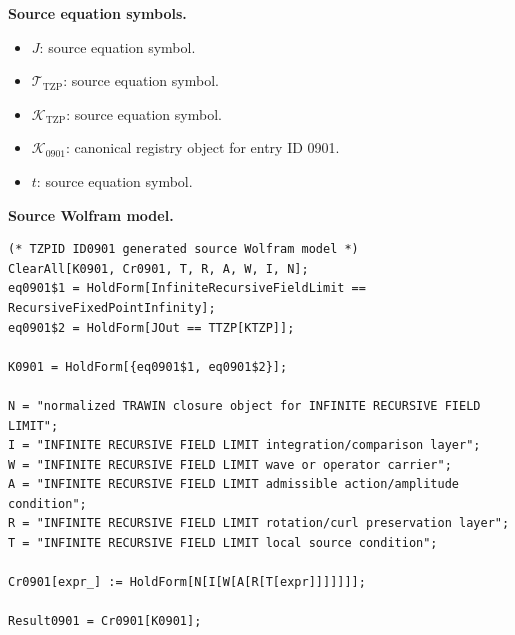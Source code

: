 \begin{minipage}[t]{0.49\linewidth}
\begingroup
\small
\raggedright
\textbf{Source equation symbols.}\par
\begin{itemize}[leftmargin=1.35em,itemsep=1pt,topsep=1pt,parsep=0pt]
    \item $J$: source equation symbol.
    \item $\mathcal{T}_{\mathrm{TZP}}$: source equation symbol.
    \item $\mathcal{K}_{\mathrm{TZP}}$: source equation symbol.
    \item $\mathcal{K}_{0901}$: canonical registry object for entry ID 0901.
    \item $t$: source equation symbol.
\end{itemize}
\endgroup
\end{minipage}\hfill
\begin{minipage}[t]{0.47\linewidth}
\begingroup
\scriptsize
\raggedright
\textbf{Source Wolfram model.}\par
\begin{Verbatim}[fontsize=\tiny,breaklines=true,breakanywhere=true]
(* TZPID ID0901 generated source Wolfram model *)
ClearAll[K0901, Cr0901, T, R, A, W, I, N];
eq0901$1 = HoldForm[InfiniteRecursiveFieldLimit == RecursiveFixedPointInfinity];
eq0901$2 = HoldForm[JOut == TTZP[KTZP]];

K0901 = HoldForm[{eq0901$1, eq0901$2}];

N = "normalized TRAWIN closure object for INFINITE RECURSIVE FIELD LIMIT";
I = "INFINITE RECURSIVE FIELD LIMIT integration/comparison layer";
W = "INFINITE RECURSIVE FIELD LIMIT wave or operator carrier";
A = "INFINITE RECURSIVE FIELD LIMIT admissible action/amplitude condition";
R = "INFINITE RECURSIVE FIELD LIMIT rotation/curl preservation layer";
T = "INFINITE RECURSIVE FIELD LIMIT local source condition";

Cr0901[expr_] := HoldForm[N[I[W[A[R[T[expr]]]]]]];

Result0901 = Cr0901[K0901];
\end{Verbatim}
\endgroup
\end{minipage}


